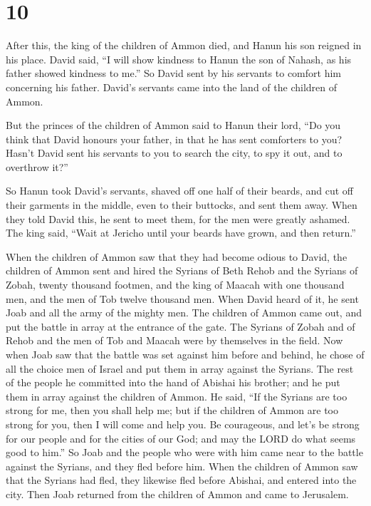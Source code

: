 \hypertarget{section-9}{%
\section{10}\label{section-9}}

 After this, the king of the children of Ammon died, and
Hanun his son reigned in his place.  David said, ``I will
show kindness to Hanun the son of Nahash, as his father showed kindness
to me.'' So David sent by his servants to comfort him concerning his
father. David's servants came into the land of the children of Ammon.

 But the princes of the children of Ammon said to Hanun
their lord, ``Do you think that David honours your father, in that he
has sent comforters to you? Hasn't David sent his servants to you to
search the city, to spy it out, and to overthrow it?''

 So Hanun took David's servants, shaved off one half of
their beards, and cut off their garments in the middle, even to their
buttocks, and sent them away.  When they told David this,
he sent to meet them, for the men were greatly ashamed. The king said,
``Wait at Jericho until your beards have grown, and then return.''

 When the children of Ammon saw that they had become
odious to David, the children of Ammon sent and hired the Syrians of
Beth Rehob and the Syrians of Zobah, twenty thousand footmen, and the
king of Maacah with one thousand men, and the men of Tob twelve thousand
men.  When David heard of it, he sent Joab and all the
army of the mighty men.  The children of Ammon came out,
and put the battle in array at the entrance of the gate. The Syrians of
Zobah and of Rehob and the men of Tob and Maacah were by themselves in
the field.  Now when Joab saw that the battle was set
against him before and behind, he chose of all the choice men of Israel
and put them in array against the Syrians.  The rest of
the people he committed into the hand of Abishai his brother; and he put
them in array against the children of Ammon.  He said,
``If the Syrians are too strong for me, then you shall help me; but if
the children of Ammon are too strong for you, then I will come and help
you.  Be courageous, and let's be strong for our people
and for the cities of our God; and may the LORD do what seems good to
him.''  So Joab and the people who were with him came
near to the battle against the Syrians, and they fled before him.
 When the children of Ammon saw that the Syrians had
fled, they likewise fled before Abishai, and entered into the city. Then
Joab returned from the children of Ammon and came to Jerusalem.

